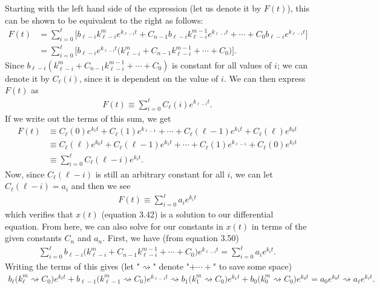 Starting with the left hand side of the expression (let us denote it by $F(t)$), this can be shown to be equivalent to the right as follows:
\begin{align}
F(t)&=\sum_{i=0}^{\ell}\bigg[b_{\ell-i} k_{\ell-i}^m e^{k_{\ell-i} t}+C_{n-1}b_{\ell-i} k_{\ell-i}^{m-1} e^{k_{\ell-i} t}+\cdots+C_0b_{\ell-i} e^{k_{\ell-i} t} \bigg] \\
&=\sum_{i=0}^{\ell}\bigg[b_{\ell-i}e^{k_{\ell-i} t}\big( k_{\ell-i}^m +C_{n-1} k_{\ell-i}^{m-1} +\cdots+C_0\big) \bigg].
\end{align}
Since $b_{\ell-i}(k_{\ell-i}^m +C_{n-1} k_{\ell-i}^{m-1} +\cdots+C_0)$ is constant for all values of $i$; we can denote it by $C_\ell(i)$, since it is dependent on the value of $i$. We can then express $F(t)$ as
\begin{align}
F(t)\equiv \sum_{i=0}^{\ell}C_\ell(i)e^{k_{\ell-i}t}.
\end{align}
If we write out the terms of this sum, we get
\begin{align}
F(t)&\equiv C_\ell(0)e^{k_\ell t}+C_\ell(1)e^{k_{\ell-1}}+\cdots+C_\ell(\ell-1)e^{k_1t}+C_\ell(\ell)e^{k_0t} \\&\equiv C_\ell(\ell)e^{k_0t}+C_\ell(\ell-1)e^{k_1t}+\cdots+C_\ell(1)e^{k_{\ell-1}}+C_\ell(0)e^{k_\ell t} \\
&\equiv \sum_{i=0}^{\ell}C_\ell(\ell-i)e^{k_it}.
\end{align}
Now, since $C_\ell(\ell-i)$ is still an arbitrary constant for all $i$, we can let $C_\ell(\ell-i)=a_i$ and then we see
\begin{align}
F(t)\equiv \sum_{i=0}^{\ell}a_i e^{k_i t}
\end{align}
which verifies that $x(t)$ (equation 3.42) is a solution to our differential equation. From here, we can also solve for our constants in $x(t)$ in terms of the given constants $C_n$ and $a_n$. First, we have (from equation 3.50)
\begin{align}
\sum_{i=0}^{\ell}b_{\ell-i}\big( k_{\ell-i}^m +C_{n-1} k_{\ell-i}^{m-1} +\cdots+C_0\big)e^{k_{\ell-i} t}=\sum_{i=0}^{\ell}a_i e^{k_i t}.
\end{align}
Writing the terms of this gives (let "$\rightsquigarrow$" denote "$+\cdots+$" to save some space)
\begin{align}
b_{\ell}\big( k_{\ell}^m\rightsquigarrow C_0\big)e^{k_{\ell} t}+b_{\ell-1}\big( k_{\ell-1}^m \rightsquigarrow C_0\big)e^{k_{\ell-1} t}\rightsquigarrow b_{1}\big( k_{1}^m \rightsquigarrow C_0\big)e^{k_{1} t}+b_{0}\big( k_{0}^m \rightsquigarrow C_0\big)e^{k_{0} t} = a_0e^{k_0t}\rightsquigarrow a_\ell e^{k_\ell t}.
\end{align}
